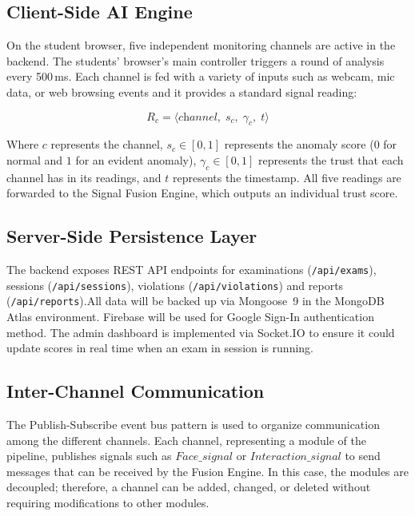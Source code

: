 \documentclass[runningheads]{llncs}
\begin{document}
\subsection{Client-Side AI Engine}

On the student browser, five independent monitoring channels are active in the backend. The students' browser's main controller triggers a round of analysis every 500\,ms. Each channel is fed with a variety of inputs such as webcam, mic data, or web browsing events and it provides a standard signal reading:

\begin{equation}
    R_c = \langle \textit{channel}, \; s_c, \; \gamma_c, \; t \rangle
\end{equation}

Where $c$ represents the channel, $s_c \in [0,1]$ represents the anomaly score ($0$ for normal and $1$ for an evident anomaly), $\gamma_c \in [0,1]$ represents the trust that each channel has in its readings, and $t$ represents the timestamp. All five readings are forwarded to the Signal Fusion Engine, which outputs an individual trust score.

\subsection{Server-Side Persistence Layer}

The backend exposes REST API endpoints for examinations (\texttt{/api/exams}), sessions (\texttt{/api/sessions}), violations (\texttt{/api/violations}) and reports (\texttt{/api/reports}).All data will be backed up via Mongoose~9 in the MongoDB Atlas environment. Firebase will be used for Google Sign-In authentication method. The admin dashboard is implemented via Socket.IO to ensure it could update scores in real time when an exam in session is running.

\subsection{Inter-Channel Communication}

The Publish-Subscribe event bus pattern is used to organize communication
among the different channels. Each channel, representing a module of the
pipeline, publishes signals such as $Face\_signal$ or $Interaction\_signal$
to send messages that can be received by the Fusion Engine. In this case,
the modules are decoupled; therefore, a channel can be added, changed, or
deleted without requiring modifications to other modules.
\end{document}
